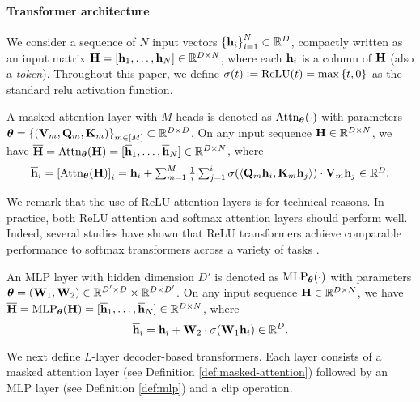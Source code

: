 \paragraph{Transformer architecture} We consider a sequence of $N$ input vectors ${\left\{ {\mathbf h}_i \right\}}_{i=1}^N\subset \mathbb{R}^D$, compactly written as an input matrix ${\mathbf H}=[{\mathbf h}_1,\dots,{\mathbf h}_N]\in \mathbb{R}^{D\times N}$, where each ${\mathbf h}_i$ is a column of ${\mathbf H}$ (also a \emph{token}). Throughout this paper, we define $\sigma(t)\mathrel{\mathop:}= \mathrm{ReLU}(t)=\max{\{ t,0 \}}$ as the standard relu activation function. %



\begin{definition}
\label{def:masked-attention}
A masked attention layer with $M$ heads is denoted as ${\rm Attn}_{{\boldsymbol \theta}}(\cdot)$ with parameters ${\boldsymbol \theta}={\{  ({\mathbf V}_m,{\mathbf Q}_m,{\mathbf K}_m) \}}_{m\in[M]}\subset \mathbb{R}^{D\times D}$. On any input sequence ${\mathbf H}\in\mathbb{R}^{D\times N}$, we have $\overline{{\mathbf H}} = {\rm Attn}_{{\boldsymbol \theta}}({\mathbf H}) = [\overline{{\mathbf h}}_1, \ldots, \overline{{\mathbf h}}_N] \in \mathbb{R}^{D \times N}$, where
\begin{align*}
\textstyle    \overline{{\mathbf h}}_i = {\left[ {\rm Attn}_{{\boldsymbol \theta}}({\mathbf H}) \right]}_i = {\mathbf h}_i + \sum_{m=1}^M \frac{1}{i}\sum_{j=1}^i \sigma{\left(  \left\langle{\mathbf Q}_m{\mathbf h}_i, {\mathbf K}_m{\mathbf h}_j\right\rangle  \right)}\cdot {\mathbf V}_m{\mathbf h}_j \in \mathbb{R}^D.
\end{align*}
\end{definition}

We remark that the use of ReLU attention layers is for technical reasons. In practice, both ReLU attention and softmax attention layers should perform well. Indeed, several studies have shown that ReLU transformers achieve comparable performance to softmax transformers  across a variety of tasks \citep{wortsman2023replacing, shen2023study, bai2023transformers}.

\begin{definition}
\label{def:mlp}
An MLP layer with hidden dimension $D'$ is denoted as $\mathrm{MLP}_{{\boldsymbol \theta}}(\cdot)$ with parameters ${\boldsymbol \theta}=({\mathbf W}_1,{\mathbf W}_2)\in\mathbb{R}^{D'\times D}\times\mathbb{R}^{D\times D'}$. On any input sequence ${\mathbf H}\in\mathbb{R}^{D\times N}$, we have $\overline{{\mathbf H}} = \mathrm{MLP}_{{\boldsymbol \theta}}({\mathbf H}) = [\overline{{\mathbf h}}_1, \ldots, \overline{{\mathbf h}}_N] \in \mathbb{R}^{D \times N}$, where
\[
\overline{{\mathbf h}}_i={\mathbf h}_i+{\mathbf W}_2 \cdot \sigma({\mathbf W}_1{\mathbf h}_i) \in \mathbb{R}^D.
\]
\end{definition}
We next define $L$-layer decoder-based transformers. Each layer consists of a masked attention layer (see Definition \ref{def:masked-attention}) followed by an MLP layer (see Definition \ref{def:mlp}) and a clip operation.




